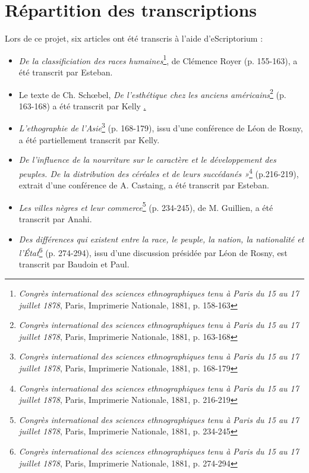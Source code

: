 \documentclass{article}
\begin{document}
	
	\section{Répartition des transcriptions}
	
	Lors de ce projet, six articles ont été transcris à l'aide d'eScriptorium :
	\begin{itemize}
		\item \textit{De la classificiation des races humaines}\footnote{\textit{Congrès international des sciences ethnographiques tenu à Paris du 15 au 17 juillet 1878}, Paris, Imprimerie Nationale, 1881, p. 158-163}, de Clémence Royer (p. 155-163), a été transcrit par Esteban.
		\item Le texte de Ch. Schœbel, \textit{De l’esthétique chez les anciens américains}\footnote{\textit{Congrès international des sciences ethnographiques tenu à Paris du 15 au 17 juillet 1878}, Paris, Imprimerie Nationale, 1881, p. 163-168}  (p. 163-168) a été transcrit par Kelly \underline.
		\item \textit{L'ethographie de l'Asie}\footnote{\textit{Congrès international des sciences ethnographiques tenu à Paris du 15 au 17 juillet 1878}, Paris, Imprimerie Nationale, 1881, p. 168-179} (p. 168-179), issu d'une conférence de Léon de Rosny, a été partiellement transcrit par Kelly.
		\item \textit{De l'influence de la nourriture sur le caractère et le développement des peuples. De la distribution des céréales et de leurs succédanés »}\footnote{\textit{Congrès international des sciences ethnographiques tenu à Paris du 15 au 17 juillet 1878}, Paris, Imprimerie Nationale, 1881, p. 216-219} (p.216-219), extrait d'une conférence de A. Castaing, a été transcrit par Esteban.
		\item \textit{Les villes nègres et leur commerce}\footnote{\textit{Congrès international des sciences ethnographiques tenu à Paris du 15 au 17 juillet 1878}, Paris, Imprimerie Nationale, 1881, p. 234-245} (p. 234-245), de M. Guillien, a été transcrit par Anahi. 
		\item \textit{Des différences qui existent entre la race, le peuple, la nation, la nationalité et l'État}\footnote{\textit{Congrès international des sciences ethnographiques tenu à Paris du 15 au 17 juillet 1878}, Paris, Imprimerie Nationale, 1881, p. 274-294} (p. 274-294), issu d'une discussion présidée par Léon de Rosny, est transcrit par Baudoin et Paul.
	\end{itemize}
	
	
	
\end{document}

